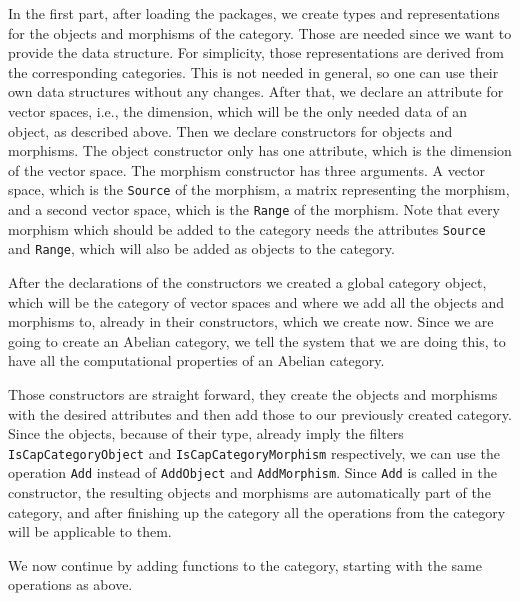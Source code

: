 In the first part, after loading the packages, we create types and representations for the objects
and morphisms of the category. Those are needed since we want to provide the data structure. For simplicity,
those representations are derived from the corresponding \CapPkg \GAP categories. This is not needed in general,
so one can use their own data structures without any changes. After that, we declare an attribute for vector spaces,
i.e., the dimension, which will be the only needed data of an object, as described above. Then we declare constructors
for objects and morphisms. The object constructor only has one attribute, which is the dimension of the vector space.
The morphism constructor has three arguments. A vector space, which is the \texttt{Source} of the morphism, a matrix
representing the morphism, and a second vector space, which is the \texttt{Range} of the morphism. Note that every morphism
which should be added to the category needs the \GAP attributes \texttt{Source} and \texttt{Range}, which will also be
added as objects to the category.



After the declarations of the constructors we created a global category \GAP object, which will be the category
of vector spaces and where we add all the objects and morphisms to, already in their constructors, which we create now.
Since we are going to create an Abelian category, we tell the system that we are doing this, to have all the computational
properties of an Abelian category.



Those constructors are straight forward, they create the objects and morphisms with the desired attributes and then
add those to our previously created category. Since the objects, because of their type, already imply the \GAP filters
\texttt{IsCapCategoryObject} and \texttt{IsCapCategoryMorphism} respectively, we can use the operation \texttt{Add} instead
of \texttt{AddObject} and \texttt{AddMorphism}. Since \texttt{Add} is called in the constructor, the resulting objects and
morphisms are automatically part of the category, and after finishing up the category all the operations from the
category will be applicable to them.

We now continue by adding functions to the category, starting with the same operations as above.




